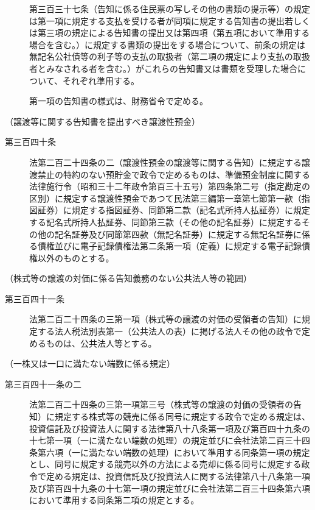\documentclass[twocolumn,a4j,10pt]{ltjtarticle}
\begin{document}
\begin{description}
\item[]第三百三十七条（告知に係る住民票の写しその他の書類の提示等）の規定は第一項に規定する支払を受ける者が同項に規定する告知書の提出若しくは第三項の規定による告知書の提出又は第四項（第五項において準用する場合を含む。）に規定する書類の提出をする場合について、前条の規定は無記名公社債等の利子等の支払の取扱者（第二項の規定により支払の取扱者とみなされる者を含む。）がこれらの告知書又は書類を受理した場合について、それぞれ準用する。
\item[]第一項の告知書の様式は、財務省令で定める。
\end{description}
\noindent\hspace{10pt}（譲渡等に関する告知書を提出すべき譲渡性預金）
\begin{description}
\item[第三百四十条]法第二百二十四条の二（譲渡性預金の譲渡等に関する告知）に規定する譲渡禁止の特約のない預貯金で政令で定めるものは、準備預金制度に関する法律施行令（昭和三十二年政令第百三十五号）第四条第二号（指定勘定の区別）に規定する譲渡性預金であつて民法第三編第一章第七節第一款（指図証券）に規定する指図証券、同節第二款（記名式所持人払証券）に規定する記名式所持人払証券、同節第三款（その他の記名証券）に規定するその他の記名証券及び同節第四款（無記名証券）に規定する無記名証券に係る債権並びに電子記録債権法第二条第一項（定義）に規定する電子記録債権以外のものとする。
\end{description}
\noindent\hspace{10pt}（株式等の譲渡の対価に係る告知義務のない公共法人等の範囲）
\begin{description}
\item[第三百四十一条]法第二百二十四条の三第一項（株式等の譲渡の対価の受領者の告知）に規定する法人税法別表第一（公共法人の表）に掲げる法人その他の政令で定めるものは、公共法人等とする。
\end{description}
\noindent\hspace{10pt}（一株又は一口に満たない端数に係る規定）
\begin{description}
\item[第三百四十一条の二]法第二百二十四条の三第一項第三号（株式等の譲渡の対価の受領者の告知）に規定する株式等の競売に係る同号に規定する政令で定める規定は、投資信託及び投資法人に関する法律第八十八条第一項及び第百四十九条の十七第一項（一に満たない端数の処理）の規定並びに会社法第二百三十四条第六項（一に満たない端数の処理）において準用する同条第一項の規定とし、同号に規定する競売以外の方法による売却に係る同号に規定する政令で定める規定は、投資信託及び投資法人に関する法律第八十八条第一項及び第百四十九条の十七第一項の規定並びに会社法第二百三十四条第六項において準用する同条第二項の規定とする。
\end{description}
\end{document}
